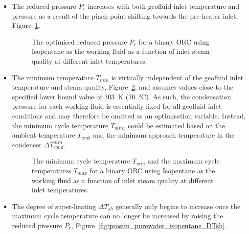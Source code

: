     \begin{itemize}
        \item The reduced pressure \(P_r\) increases with both geofluid inlet temperature and pressure as a result of the pinch-point shifting towards the pre-heater inlet, Figure~\ref{fig:prosim_purewater_isopentane_Pr}.

        \begin{figure}[H]
            \centering
            
            \caption[The optimised reduced pressure \(P_r\) for a binary \ac{ORC} using Isopentane as the working fluid.]{The optimised reduced pressure \(P_r\) for a binary \ac{ORC} using Isopentane as the working fluid as a function of inlet steam quality at different inlet temperatures.}
            \label{fig:prosim_purewater_isopentane_Pr}
        \end{figure}
        
        \item The minimum temperature \(T_{min}\) is virtually independent of the geofluid inlet temperature and steam quality, Figure~\ref{fig:prosim_purewater_isopentane_TminTmax}, and assumes values close to the specified lower bound value of \qty{303}{\K} (\qty{30}{\degreeCelsius}). As such, the condensation pressure for each working fluid is essentially fixed for all geofluid inlet conditions and may therefore be omitted as an optimisation variable. Instead, the minimum cycle temperature \(T_{min}\), could be estimated based on the ambient temperature \(T_{amb}\) and the minimum approach temperature in the condenser \(\Delta T_{cond}^{min}\).

        \begin{figure}[H]
            \centering
            
            \caption[The minimum cycle temperature \(T_{min}\) and the maximum cycle temperatures \(T_{max}\) for a binary \ac{ORC} using Isopentane as the working fluid.]{The minimum cycle temperature \(T_{min}\) and the maximum cycle temperatures \(T_{max}\) for a binary \ac{ORC} using Isopentane as the working fluid as a function of inlet steam quality at different inlet temperatures.}
            \label{fig:prosim_purewater_isopentane_TminTmax}
        \end{figure}

        \item The degree of super-heating \(\Delta T_{sh}\) generally only begins to increase once the maximum cycle temperature can no longer be increased by raising the reduced pressure \(P_r\), Figure~\ref{fig:prosim_purewater_isopentane_DTsh}.


\end{itemize}
